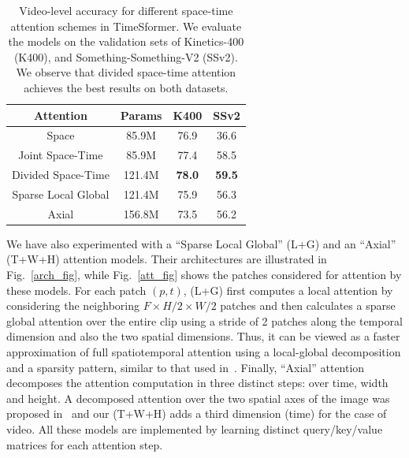 \documentclass{article}
\newcommand{\LT}[1]{\textcolor{blue}{{\bf LT:} #1}}
\begin{document}
\begin{table}[t]
\scriptsize
\begin{center}
\begin{tabular}{ c c   c  c } 
 \hline
 Attention & Params & K400 & SSv2\\ \hline
Space & 85.9M &  76.9 & 36.6 \\
Joint Space-Time & 85.9M & 77.4 & 58.5 \\
Divided Space-Time & 121.4M &  \bf 78.0 & \bf 59.5\\
Sparse Local Global & 121.4M &  75.9 & 56.3 \\
Axial & 156.8M & 73.5 & 56.2 \\
\hline
\end{tabular}
\end{center}
\vspace{-0.2cm}
\caption{Video-level accuracy for different space-time attention schemes in TimeSformer. %
We evaluate the models on the validation sets of Kinetics-400 (K400), and Something-Something-V2 (SSv2). We observe that divided space-time attention achieves the best results on both datasets.\vspace{-0.3cm}} %
\label{att_results_table}
\end{table}



We have also experimented with a ``Sparse Local Global'' (L+G) and an ``Axial'' (T+W+H) attention models. Their architectures are illustrated in Fig.~\ref{arch_fig}, while Fig.~\ref{att_fig} shows the patches considered for attention by these models. For each patch $(p,t)$, (L+G) first computes a local attention by considering the neighboring $F \times H/2 \times W/2$ patches and then calculates a sparse global attention over the entire clip using a stride of 2 patches along the temporal dimension and also the two spatial dimensions. Thus, it can be viewed as a faster approximation of full spatiotemporal attention using a local-global decomposition and a sparsity pattern, similar to that used in~\cite{Child:OpenAI}. Finally, ``Axial'' attention decomposes the attention computation in three distinct steps: over time, width and height. A decomposed attention over the two spatial axes of the image was proposed in~\cite{Ho:Axial, huang2018ccnet, Wang:Axial} and our (T+W+H) adds a third dimension (time) for the case of video. All these models are implemented by learning distinct query/key/value matrices for each attention step. %
\end{document}
